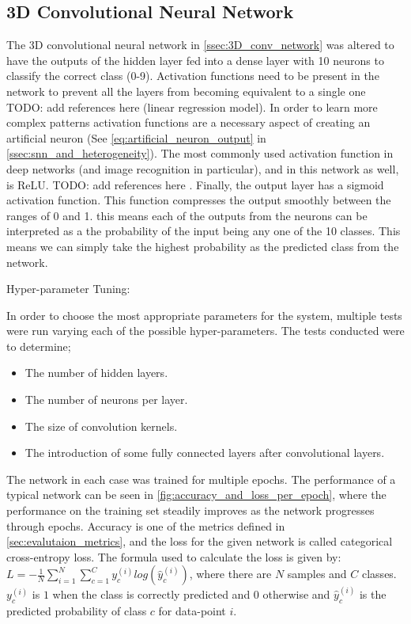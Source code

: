 \subsection{3D Convolutional Neural Network}

The 3D convolutional neural network in \cref{ssec:3D_conv_network} was altered to have the outputs of the hidden layer fed into a dense layer with 10 neurons to classify the correct class (0-9). Activation functions need to be present in the network to prevent all the layers from becoming equivalent to a single one \color{red} TODO: add references here \color{black} (linear regression model). In order to learn more complex patterns activation functions are a necessary aspect of creating an artificial neuron (See \cref{eq:artificial_neuron_output} in \cref{ssec:snn_and_heterogeneity}). The most commonly used activation function in deep networks (and image recognition in particular), and in this network as well, is ReLU. \color{red} TODO: add references here \color{black}. Finally, the output layer has a sigmoid activation function. This function compresses the output smoothly between the ranges of 0 and 1. this means each of the outputs from the neurons can be interpreted as a the probability of the input being any one of the 10 classes. This means we can simply take the highest probability as the predicted class from the network.

Hyper-parameter Tuning:

In order to choose the most appropriate parameters for the system, multiple tests were run varying each of the possible hyper-parameters. The tests conducted were to determine;

\begin{itemize}
    \item The number of hidden layers.
    \item The number of neurons per layer.
    \item The size of convolution kernels.
    \item The introduction of some fully connected layers after convolutional layers.
\end{itemize}

The network in each case was trained for multiple epochs. The performance of a typical network can be seen in \cref{fig:accuracy_and_loss_per_epoch}, where the performance on the training set steadily improves as the network progresses through epochs. Accuracy is one of the metrics defined in \cref{sec:evalutaion_metrics}, and the loss for the given network is called categorical cross-entropy loss. The formula used to calculate the loss is given by: $ L = -\frac{1}{N}\sum^N_{i=1}\sum^C_{c=1}y_c^{(i)}log(\hat{y}_c^{(i)}) $, where there are $ N $ samples and $ C $ classes. $ y_c^{(i)} $ is $ 1 $ when the class is correctly predicted and $ 0 $ otherwise and $ \hat{y}_c^{(i)} $ is the predicted probability of class $ c $ for data-point $ i $.

